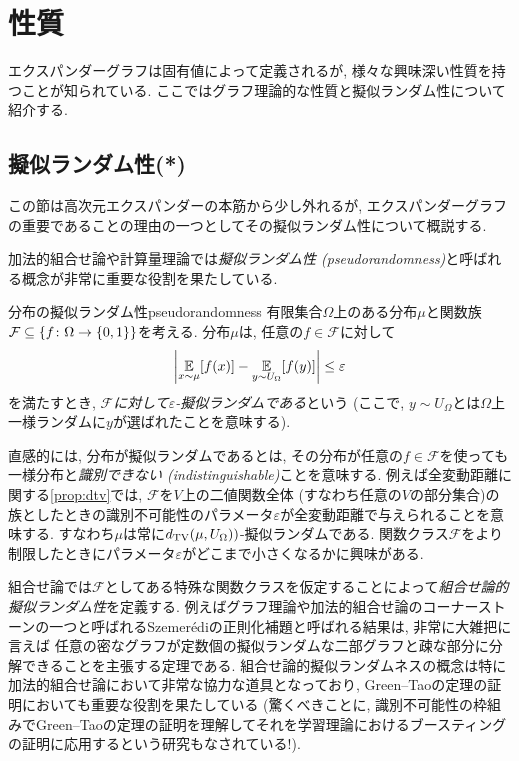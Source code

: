 \section{性質}
エクスパンダーグラフは固有値によって定義されるが, 様々な興味深い性質を持つことが知られている.
ここではグラフ理論的な性質と擬似ランダム性について紹介する.
%


\subsection{擬似ランダム性(*)} \label{sec:expander pseudorandom}
この節は高次元エクスパンダーの本筋から少し外れるが,
エクスパンダーグラフの重要であることの理由の一つとしてその擬似ランダム性について概説する.

加法的組合せ論や計算量理論では\emph{擬似ランダム性 (pseudorandomness)}と呼ばれる概念が非常に重要な役割を果たしている.
\begin{definition}{分布の擬似ランダム性}{pseudorandomness}
    有限集合$\Omega$上のある分布$\mu$と関数族$\mathcal{F} \subseteq \{f\colon \Omega \to \{0,1\}\}$を考える.
    分布$\mu$は,
    任意の$f\in \mathcal{F}$に対して
    \[ \left\lvert\operatorname*{\mathbb{E}}_{x\sim \mu} [f(x)] - \operatorname*{\mathbb{E}}_{y\sim U_{\Omega}}[f(y)]\right\rvert \le \varepsilon\]
    を満たすとき, \emph{$\mathcal{F}$に対して$\varepsilon$-擬似ランダムである}という (ここで, $y\sim U_\Omega$とは$\Omega$上一様ランダムに$y$が選ばれたことを意味する).
\end{definition}
直感的には, 分布が擬似ランダムであるとは, その分布が任意の$f\in \mathcal{F}$を使っても一様分布と\emph{識別できない (indistinguishable)}ことを意味する.
例えば全変動距離に関する\cref{prop:dtv}では, $\mathcal{F}$を$V$上の二値関数全体 (すなわち任意の$V$の部分集合)の族としたときの識別不可能性のパラメータ$\varepsilon$が全変動距離で与えられることを意味する.
すなわち$\mu$は常に$d_{\mathrm{TV}}(\mu,U_{\Omega}))$-擬似ランダムである.
関数クラス$\mathcal{F}$をより制限したときにパラメータ$\varepsilon$がどこまで小さくなるかに興味がある.

組合せ論では$\mathcal{F}$としてある特殊な関数クラスを仮定することによって\emph{組合せ論的擬似ランダム性}を定義する.
例えばグラフ理論や加法的組合せ論のコーナーストーンの一つと呼ばれるSzemerédiの正則化補題と呼ばれる結果は, 非常に大雑把に言えば
任意の密なグラフが定数個の擬似ランダムな二部グラフと疎な部分に分解できることを主張する定理である.
組合せ論的擬似ランダムネスの概念は特に加法的組合せ論において非常な協力な道具となっており,
Green--Taoの定理の証明においても重要な役割を果たしている
(驚くべきことに, 識別不可能性の枠組みでGreen--Taoの定理の証明を理解してそれを学習理論におけるブースティングの証明に応用するという研究もなされている!).

